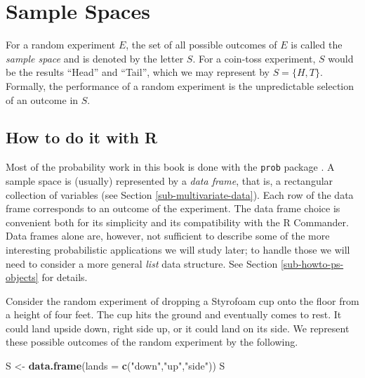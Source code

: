 \documentclass[]{book}
\newenvironment{Shaded}{\begin{snugshade}}{\end{snugshade}}
\newcommand{\KeywordTok}[1]{\textcolor[rgb]{0.13,0.29,0.53}{\textbf{{#1}}}}
\newcommand{\DataTypeTok}[1]{\textcolor[rgb]{0.13,0.29,0.53}{{#1}}}
\newcommand{\StringTok}[1]{\textcolor[rgb]{0.31,0.60,0.02}{{#1}}}
\newcommand{\NormalTok}[1]{{#1}}
\numberwithin{equation}{chapter}
\numberwithin{figure}{chapter}
\theoremstyle{plain}
\theoremstyle{definition}
\theoremstyle{remark}
\theoremstyle{definition}
\theoremstyle{definition}
\theoremstyle{remark}
\let\BeginKnitrBlock\begin \let\EndKnitrBlock\end
\begin{document}
\section{Sample Spaces}\label{sec-sample-spaces}

For a random experiment \(E\), the set of all possible outcomes of \(E\)
is called the \emph{sample space}  and is denoted by
the letter \(S\). For a coin-toss experiment, \(S\) would be the results
``Head'' and ``Tail'', which we may represent by \(S = \{H,T \}\).
Formally, the performance of a random experiment is the unpredictable
selection of an outcome in \(S\).

\subsection{How to do it with R}\label{how-to-do-it-with-r-8}

Most of the probability work in this book is done with the \texttt{prob}
package \autocite{prob}. A sample space is (usually) represented by a
\emph{data frame}, that is, a rectangular collection of variables (see
Section \ref{sub-multivariate-data}). Each row of the data frame
corresponds to an outcome of the experiment. The data frame choice is
convenient both for its simplicity and its compatibility with the R
Commander. Data frames alone are, however, not sufficient to describe
some of the more interesting probabilistic applications we will study
later; to handle those we will need to consider a more general
\emph{list} data structure. See Section \ref{sub-howto-ps-objects} for
details.

\bigskip

\BeginKnitrBlock{example}
\protect\hypertarget{ex:unnamed-chunk-88}{}{\label{ex:unnamed-chunk-88}}Consider
the random experiment of dropping a Styrofoam cup onto the floor from a
height of four feet. The cup hits the ground and eventually comes to
rest. It could land upside down, right side up, or it could land on its
side. We represent these possible outcomes of the random experiment by
the following.
\EndKnitrBlock{example}

\begin{Shaded}
\begin{Highlighting}[]
\NormalTok{S <-}\StringTok{ }\KeywordTok{data.frame}\NormalTok{(}\DataTypeTok{lands =} \KeywordTok{c}\NormalTok{(}\StringTok{"down"}\NormalTok{,}\StringTok{"up"}\NormalTok{,}\StringTok{"side"}\NormalTok{))}
\NormalTok{S}
\end{Highlighting}
\end{Shaded}
\end{document}
